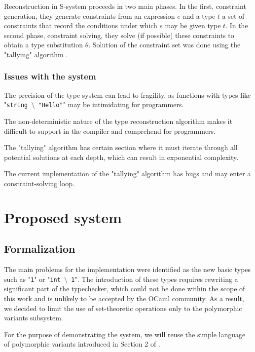 \documentclass[a4paper,11pt,oneside]{article}
\theoremstyle{definition}
\begin{document}
Reconstruction in S-system proceeds in two main phases. In
the first, constraint generation, they generate constraints from
an expression $e$ and a type $t$ a set of constraints that record the
conditions under which $e$ may be given type $t$. In the second phase,
constraint solving, they solve (if possible) these
constraints to obtain a type substitution $\theta$.
Solution of the constraint set was done using the "tallying" algorithm
\cite{Castagna_2015}.

\subsubsection{Issues with the system}

The precision of the type system can lead to fragility, as functions
with types like "\texttt{string $\setminus$ "Hello"}" may be intimidating
for programmers.

The non-deterministic nature of the type reconstruction algorithm makes
it difficult to support in the compiler and comprehend for programmers.

The "tallying" algorithm has certain section where it must iterate
through all potential solutions at each depth, which can result in
exponential complexity.

The current implementation of the "tallying" algorithm has bugs and may
enter a constraint-solving loop.

\section{Proposed system}

\subsection{Formalization}

The main problems for the implementation were identified as the new basic
types such as "\texttt{1}" or "\texttt{int $\setminus$ 1}". The introduction
of these types requires rewriting a significant part of the typechecker,
which could not be done within the scope of this work and is unlikely to
be accepted by the OCaml community. As a result, we decided to limit the
use of set-theoretic operations only to the polymorphic variants subsystem.

For the purpose of demonstrating the system, we will reuse the simple
language of polymorphic variants introduced in Section 2 of \cite{Castagna_2016}.
\end{document}
